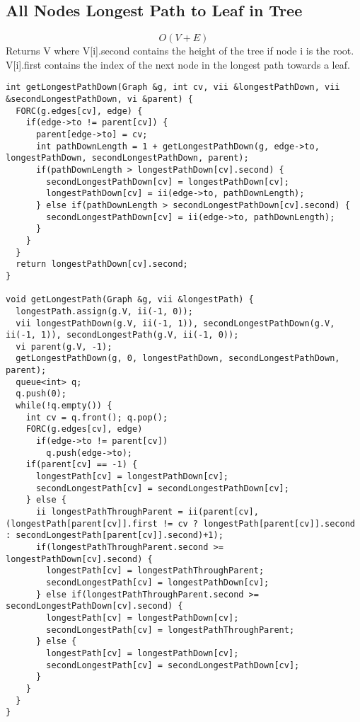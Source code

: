 \documentclass[11pt, oneside]{article}
\begin{document}
\subsection{All Nodes Longest Path to Leaf in Tree}
\[O(V+E)\]
Returns V where V[i].second contains the height of the tree if node i is the root.\\
V[i].first contains the index of the next node in the longest path towards a leaf.\\
\begin{lstlisting}
int getLongestPathDown(Graph &g, int cv, vii &longestPathDown, vii &secondLongestPathDown, vi &parent) {
  FORC(g.edges[cv], edge) {
    if(edge->to != parent[cv]) {
      parent[edge->to] = cv;
      int pathDownLength = 1 + getLongestPathDown(g, edge->to, longestPathDown, secondLongestPathDown, parent);
      if(pathDownLength > longestPathDown[cv].second) {
        secondLongestPathDown[cv] = longestPathDown[cv];
        longestPathDown[cv] = ii(edge->to, pathDownLength);
      } else if(pathDownLength > secondLongestPathDown[cv].second) {
        secondLongestPathDown[cv] = ii(edge->to, pathDownLength);
      }
    }
  }
  return longestPathDown[cv].second;
}

void getLongestPath(Graph &g, vii &longestPath) {
  longestPath.assign(g.V, ii(-1, 0));
  vii longestPathDown(g.V, ii(-1, 1)), secondLongestPathDown(g.V, ii(-1, 1)), secondLongestPath(g.V, ii(-1, 0));
  vi parent(g.V, -1);
  getLongestPathDown(g, 0, longestPathDown, secondLongestPathDown, parent);
  queue<int> q;
  q.push(0);
  while(!q.empty()) {
    int cv = q.front(); q.pop();
    FORC(g.edges[cv], edge)
      if(edge->to != parent[cv]) 
        q.push(edge->to);
    if(parent[cv] == -1) {
      longestPath[cv] = longestPathDown[cv];
      secondLongestPath[cv] = secondLongestPathDown[cv];
    } else {
      ii longestPathThroughParent = ii(parent[cv], (longestPath[parent[cv]].first != cv ? longestPath[parent[cv]].second : secondLongestPath[parent[cv]].second)+1);
      if(longestPathThroughParent.second >= longestPathDown[cv].second) {
        longestPath[cv] = longestPathThroughParent;
        secondLongestPath[cv] = longestPathDown[cv];
      } else if(longestPathThroughParent.second >= secondLongestPathDown[cv].second) {
        longestPath[cv] = longestPathDown[cv];
        secondLongestPath[cv] = longestPathThroughParent;
      } else {
        longestPath[cv] = longestPathDown[cv];
        secondLongestPath[cv] = secondLongestPathDown[cv];
      }
    }
  }
}
\end{lstlisting}
\end{document}
